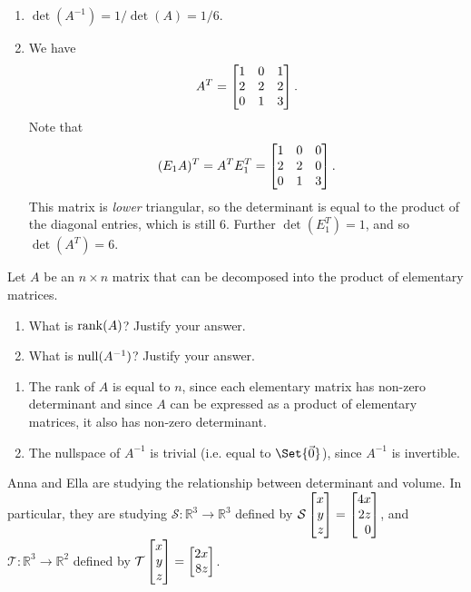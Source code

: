 \begin{exercises}
\begin{problist}
\begin{solution}
\begin{enumerate}
				\item $\det(A^{-1}) = 1/\det(A) = 1/6$.

				\item We have
					\[
						A^{T} =
						\mat{
							1 & 0 & 1 \\
							2 & 2 & 2 \\
							0 & 1 & 3
						}.
					\] Note that
					\[
						(E_{1} A)^{T} = A^{T} E_{1}^{T} =
						\mat{
							1 & 0 & 0 \\
							2 & 2 & 0 \\
							0 & 1 & 3
						}.
					\] This matrix is \emph{lower} triangular, so the determinant is
					equal to the product of the diagonal entries, which is still $6$.
					Further $\det(E_{1}^{T}) = 1$, and so $\det(A^{T}) = 6$.
			\end{enumerate}
		\end{solution}

		\prob Let $A$ be an $n \times n$ matrix that can be decomposed into the
		product of elementary matrices.
		\begin{enumerate}
			\item What is $\operatorname{rank}(A)$? Justify your answer.

			\item What is $\operatorname{null}(A^{-1})$? Justify your answer.
		\end{enumerate}
		\begin{solution}
			\begin{enumerate}
				\item The rank of $A$ is equal to $n$, since each elementary matrix
					has non-zero determinant and since $A$ can be expressed as a product
					of elementary matrices, it also has non-zero determinant.

				\item The nullspace of $A^{-1}$ is trivial (i.e. equal to $\Set{\vec 0}$), since $A^{-1}$ is
					invertible.
			\end{enumerate}
		\end{solution}

		\prob Anna and Ella are studying the relationship between determinant and
		volume. In particular, they are studying $\mathcal{S}:\mathbb{R}^{3}\rightarrow
		\mathbb{R}^{3}$ defined by $\mathcal{S}\mat{x \\ y \\ z}=\mat{4x \\ 2z \\ 0}$,
		and $\mathcal{T}:\mathbb{R}^{3}\rightarrow\mathbb{R}^{2}$ defined by
		$\mathcal{T}\mat{x \\ y \\ z}=\mat{2x \\ 8z}$.


\end{problist}
\end{exercises}
